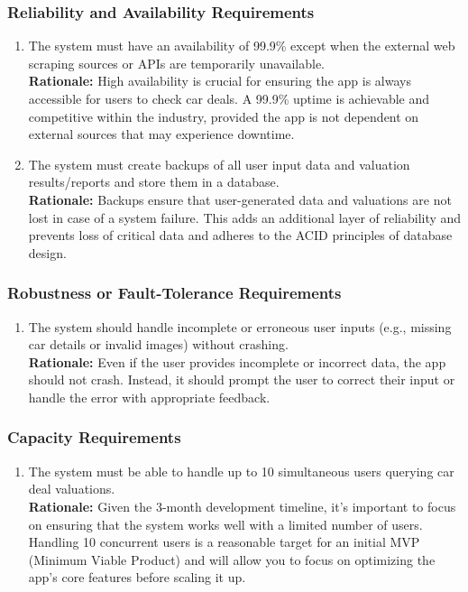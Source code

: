 \documentclass[]{article}
\begin{document}
\subsubsection{Reliability and Availability Requirements}
\label{ssub:reliability_and_availability_requirements}
\begin{enumerate}[{PR-RA}1.]
    \item The system must have an availability of 99.9\% except when the external web scraping sources or APIs are temporarily unavailable.  \\
    \textbf{Rationale:} High availability is crucial for ensuring the app is always accessible for users to check car deals. A 99.9\% uptime is achievable and competitive within the industry, provided the app is not dependent on external sources that may experience downtime. 

    \item The system must create backups of all user input data and valuation results/reports and store them in a database.  \\
    \textbf{Rationale:} Backups ensure that user-generated data and valuations are not lost in case of a system failure. This adds an additional layer of reliability and prevents loss of critical data and adheres to the ACID principles of database design.
\end{enumerate}

\subsubsection{Robustness or Fault-Tolerance Requirements}
\label{ssub:robustness_or_fault_tolerance_requirements}
\begin{enumerate}[{PR-RFT}1.]
    \item The system should handle incomplete or erroneous user inputs (e.g., missing car details or invalid images) without crashing.  \\
    \textbf{Rationale:} Even if the user provides incomplete or incorrect data, the app should not crash. Instead, it should prompt the user to correct their input or handle the error with appropriate feedback.
\end{enumerate}

\subsubsection{Capacity Requirements}
\label{ssub:capacity_requirements}
\begin{enumerate}[{PR-C}1.]
    \item The system must be able to handle up to 10 simultaneous users querying car deal valuations.  \\
    \textbf{Rationale:} Given the 3-month development timeline, it's important to focus on ensuring that the system works well with a limited number of users. Handling 10 concurrent users is a reasonable target for an initial MVP (Minimum Viable Product) and will allow you to focus on optimizing the app's core features before scaling it up.
\end{enumerate}
\end{document}
